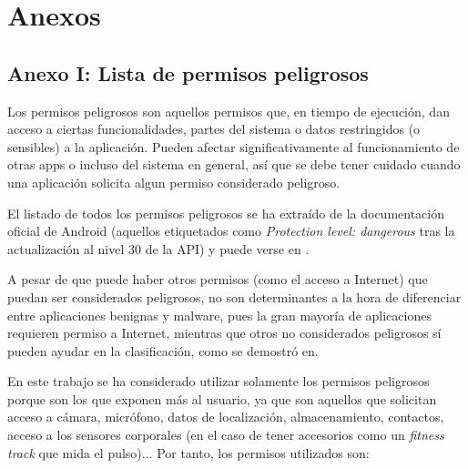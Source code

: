 \chapter{Anexos}

\section{Anexo I: Lista de permisos peligrosos}
\label{lista_permisos}

Los permisos peligrosos son aquellos permisos que, en tiempo de ejecución, dan acceso a ciertas funcionalidades, partes del sistema o datos restringidos (o sensibles) a la aplicación. Pueden afectar significativamente al funcionamiento de otras apps o incluso del sistema en general, así que se debe tener cuidado cuando una aplicación solicita algun permiso considerado peligroso.

El listado de todos los permisos peligrosos se ha extraído de la documentación oficial de Android (aquellos etiquetados como \textit{Protection level: dangerous} tras la actualización al nivel 30 de la API) y puede verse en \hypersetup{citecolor=red}\cite{riskyperm}.

A pesar de que puede haber otros permisos (como el acceso a Internet) que puedan ser considerados peligrosos, no son determinantes a la hora de diferenciar entre aplicaciones benignas y malware, pues la gran mayoría de aplicaciones requieren permiso a Internet, mientras que otros no considerados peligrosos sí pueden ayudar en la clasificación, como se demostró en\hypersetup{citecolor=red}\cite{sigpid}.

En este trabajo se ha considerado utilizar solamente los permisos peligrosos porque son los que exponen más al usuario, ya que son aquellos que solicitan acceso a cámara, micrófono, datos de localización, almacenamiento, contactos, acceso a los sensores corporales (en el caso de tener accesorios como un \textit{fitness track} que mida el pulso)... Por tanto, los permisos utilizados son:

